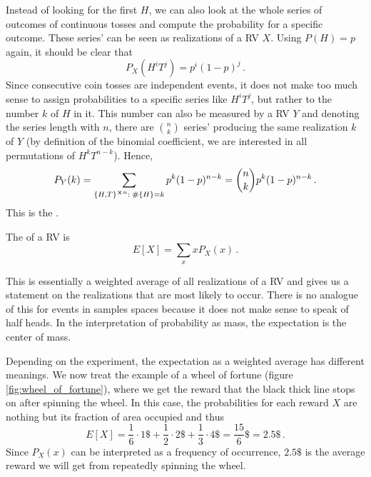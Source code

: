 \begin{ex}
Instead of looking for the first $H$, we can also look at the whole series of outcomes of continuous tosses and compute the probability for a specific outcome. These series' can be seen as realizations of a RV $X$. Using $P(H) = p$ again, it should be clear that
\begin{equation*}
P_X(H^i T^j) = p^i (1 - p)^j \, .
\end{equation*}
Since consecutive coin tosses are independent events, it does not make too much sense to assign probabilities to a specific series like $H^i T^j$, but rather to the number $k$ of $H$ in it. This number can also be measured by a RV $Y$ and denoting the series length with $n$, there are $\binom{n}{k}$ series' producing the same realization $k$ of $Y$ (by definition of the binomial coefficient, we are interested in all permutations of $H^k T^{n - k}$). Hence,
\begin{equation*}
P_Y(k) = \sum_{\qty{H, T}^{\cross n}: \; \#\qty{H} = k} p^k (1 - p)^{n - k} = \binom{n}{k} p^k (1 - p)^{n - k} \, .
\end{equation*}
This is the .
\end{ex}


\begin{defi}[Expectation]
The  of a RV is
\begin{equation}
E[X] = \sum_x x P_X(x) \, .
\end{equation}
\end{defi}
This is essentially a weighted average of all realizations of a RV and gives us a statement on the realizations that are most likely to occur. There is no analogue of this for events in samples spaces because it does not make sense to speak of half heads. In the interpretation of probability as mass, the expectation is the center of mass.


\begin{ex}
Depending on the experiment, the expectation as a weighted average has different meanings. We now treat the example of a wheel of fortune (figure \ref{fig:wheel_of_fortune}), where we get the reward that the black thick line stops on after spinning the wheel. In this case, the probabilities for each reward $X$ are nothing but its fraction of area occupied and thus
\begin{equation*}
E[X] = \frac{1}{6} \cdot 1\$ + \frac{1}{2} \cdot 2\$ + \frac{1}{3} \cdot 4\$ = \frac{15}{6} \$ = 2.5\$ \, .
\end{equation*}
Since $P_X(x)$ can be interpreted as a frequency of occurrence, $2.5\$$ is the average reward we will get from repeatedly spinning the wheel.
\end{ex}



